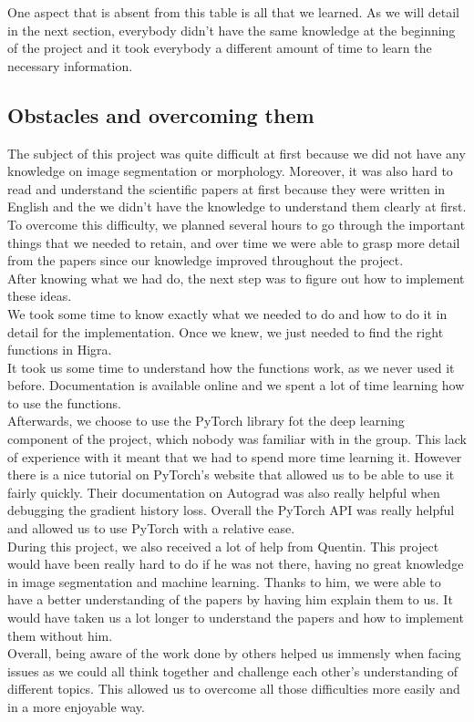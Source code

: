 One aspect that is absent from this table is all that we learned.
As we will detail in the next section, everybody didn't have the same knowledge
at the beginning of the project and it took everybody a different amount of
time to learn the necessary information.\\

\clearpage
\subsection{Obstacles and overcoming them}

The subject of this project was quite difficult at first because we did not have
any knowledge on image segmentation or morphology. Moreover, it was also hard to read and
understand the scientific papers at first because they were written in English and the
we didn't have the knowledge to understand them clearly at first. To overcome this difficulty, we planned several
hours to go through the important things that we needed to retain, and over
time we were able to grasp more detail from the papers since our knowledge
improved throughout the project.\\

After knowing what we had do, the next step was to figure out how to implement
these ideas.\\
We took some time to know exactly what we needed to do and how to do it in detail for the implementation.
Once we knew, we just needed to find the right functions in Higra.\\
It took us some time to understand how the functions work, as we never used it before.
Documentation is available online and we spent a lot of time learning how to use the
functions.\\
Afterwards, we choose to use the PyTorch library fot the deep learning
component of the project, which nobody was familiar with in the group. 
This lack of experience with it meant that we had to spend more time learning
it. However there is a nice tutorial on PyTorch's website that allowed us to
be able to use it fairly quickly. Their documentation on Autograd was also
really helpful when debugging the gradient history loss. Overall the PyTorch
API was really helpful and allowed us to use PyTorch with a relative ease.\\

During this project, we also received a lot of help from Quentin. This project would
have been really hard to do if he was not there, having no great knowledge in
image segmentation and machine learning. Thanks to him, we were able to have a
better understanding of the papers by having him explain them to us. It would have taken us
a lot longer to understand the papers and how to implement them without him.\\

Overall, being aware of the work done by others helped us immensly when
facing issues as we could all think together and challenge each other's
understanding of different topics. This allowed us to overcome all those
difficulties more easily and in a more enjoyable way.
